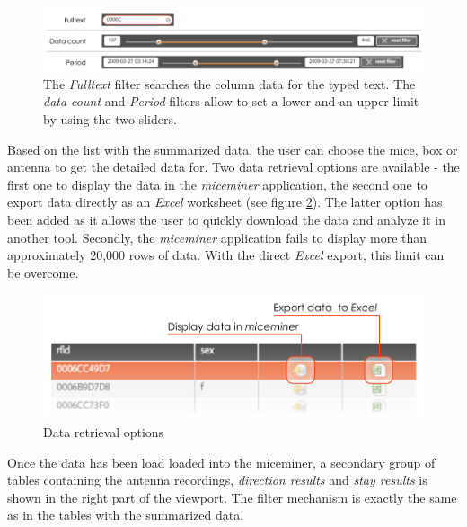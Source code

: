 \begin{figure}[htpb]
\begin{center}
  \includegraphics[width=\textwidth]{assets/pdf/filter_types.pdf}
  \caption[Filter types]{The \textit{Fulltext} filter searches the column data for the typed text. The \textit{data count} and \textit{Period} filters allow to set a lower and an upper limit by using the two sliders.}
  \label{fig:filter_types}
\end{center}
\end{figure}

Based on the list with the summarized data, the user can choose the mice, box or antenna to get the detailed data for. Two data retrieval options are available - the first one to display the data in the \textit{miceminer} application, the second one to export data directly as an \textit{Excel} worksheet (see figure \ref{fig:get_data_options}). The latter option has been added as it allows the user to quickly download the data and analyze it in another tool. Secondly, the \textit{miceminer} application fails to display more than approximately 20,000 rows of data. With the direct \textit{Excel} export, this limit can be overcome.    

\begin{figure}[htpb]
\begin{center}
  \includegraphics[width=.75\textwidth]{assets/pdf/get_data_options.pdf}
  \caption{Data retrieval options}
  \label{fig:get_data_options}
\end{center}
\end{figure}

Once the data has been load loaded into the miceminer, a secondary group of tables containing the antenna recordings, \textit{direction results} and \textit{stay results} is shown in the right part of the viewport. The filter mechanism is exactly the same as in the tables with the summarized data.

